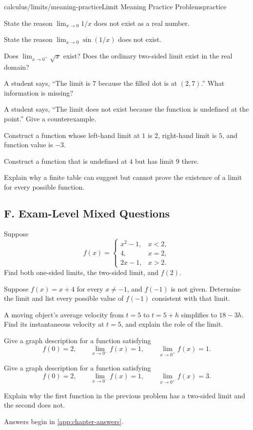 \begin{webpage}{calculus/limits/meaning-practice}{Limit Meaning Practice Problems}{practice}
\begin{bgexercises}[label=\textbf{1.\arabic*},resume]
  \item State the reason \(\lim_{x\to0}1/x\) does not exist as a real number.
  \item State the reason \(\lim_{x\to0}\sin(1/x)\) does not exist.
  \item Does \(\lim_{x\to0^+}\sqrt{x}\) exist? Does the ordinary two-sided limit exist in the real domain?
  \item A student says, ``The limit is \(7\) because the filled dot is at \((2,7)\).'' What information is missing?
  \item A student says, ``The limit does not exist because the function is undefined at the point.'' Give a counterexample.
  \item Construct a function whose left-hand limit at \(1\) is \(2\), right-hand limit is \(5\), and function value is \(-3\).
  \item Construct a function that is undefined at \(4\) but has limit \(9\) there.
  \item Explain why a finite table can suggest but cannot prove the existence of a limit for every possible function.
\end{bgexercises}

\subsection*{F. Exam-Level Mixed Questions}

\begin{bgexercises}[label=\textbf{1.\arabic*},resume]
  \item Suppose
  \[
    f(x)=\begin{cases}
      x^2-1,&x<2,\\
      4,&x=2,\\
      2x-1,&x>2.
    \end{cases}
  \]
  Find both one-sided limits, the two-sided limit, and \(f(2)\).
  \item Suppose \(f(x)=x+4\) for every \(x\ne-1\), and \(f(-1)\) is not given. Determine the limit and list every possible value of \(f(-1)\) consistent with that limit.
  \item A moving object's average velocity from \(t=5\) to \(t=5+h\) simplifies to \(18-3h\). Find its instantaneous velocity at \(t=5\), and explain the role of the limit.
  \item Give a graph description for a function satisfying
  \[
    f(0)=2,\qquad
    \lim_{x\to0^-}f(x)=1,\qquad
    \lim_{x\to0^+}f(x)=1.
  \]
  \item Give a graph description for a function satisfying
  \[
    f(0)=2,\qquad
    \lim_{x\to0^-}f(x)=1,\qquad
    \lim_{x\to0^+}f(x)=3.
  \]
  \item Explain why the first function in the previous problem has a two-sided limit and the second does not.
\end{bgexercises}

Answers begin in \cref{app:chapter-answers}.
\end{webpage}
